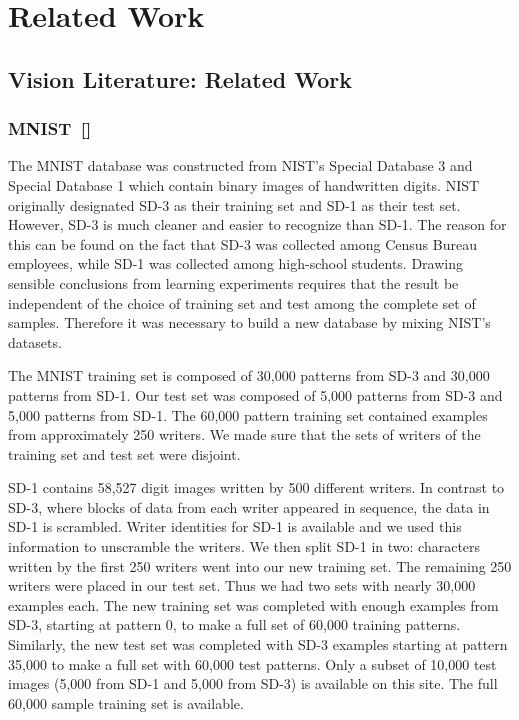 \section{Related Work}
\label{sec:Related}
\subsection{Vision Literature: Related Work}
\subsubsection{MNIST~[\cite{lecun_gradient-based_1998}]}
The MNIST database was constructed from NIST's Special Database 3 and Special Database 1 which contain binary images of handwritten digits. NIST originally designated SD-3 as their training set and SD-1 as their test set. However, SD-3 is much cleaner and easier to recognize than SD-1. The reason for this can be found on the fact that SD-3 was collected among Census Bureau employees, while SD-1 was collected among high-school students. Drawing sensible conclusions from learning experiments requires that the result be independent of the choice of training set and test among the complete set of samples. Therefore it was necessary to build a new database by mixing NIST's datasets.

The MNIST training set is composed of 30,000 patterns from SD-3 and 30,000 patterns from SD-1. Our test set was composed of 5,000 patterns from SD-3 and 5,000 patterns from SD-1. The 60,000 pattern training set contained examples from approximately 250 writers. We made sure that the sets of writers of the training set and test set were disjoint.

SD-1 contains 58,527 digit images written by 500 different writers. In contrast to SD-3, where blocks of data from each writer appeared in sequence, the data in SD-1 is scrambled. Writer identities for SD-1 is available and we used this information to unscramble the writers. We then split SD-1 in two: characters written by the first 250 writers went into our new training set. The remaining 250 writers were placed in our test set. Thus we had two sets with nearly 30,000 examples each. The new training set was completed with enough examples from SD-3, starting at pattern 0, to make a full set of 60,000 training patterns. Similarly, the new test set was completed with SD-3 examples starting at pattern 35,000 to make a full set with 60,000 test patterns. Only a subset of 10,000 test images (5,000 from SD-1 and 5,000 from SD-3) is available on this site. The full 60,000 sample training set is available.

